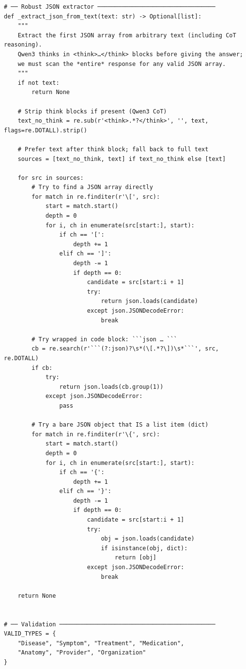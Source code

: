 \documentclass[11pt]{article}
\begin{document}
\begin{lstlisting}[style=pythoncode, caption={kg\_generator\_gpu\_1.py}]
# ── Robust JSON extractor ──────────────────────────────────
def _extract_json_from_text(text: str) -> Optional[list]:
    """
    Extract the first JSON array from arbitrary text (including CoT reasoning).
    Qwen3 thinks in <think>…</think> blocks before giving the answer;
    we must scan the *entire* response for any valid JSON array.
    """
    if not text:
        return None

    # Strip think blocks if present (Qwen3 CoT)
    text_no_think = re.sub(r'<think>.*?</think>', '', text, flags=re.DOTALL).strip()

    # Prefer text after think block; fall back to full text
    sources = [text_no_think, text] if text_no_think else [text]

    for src in sources:
        # Try to find a JSON array directly
        for match in re.finditer(r'\[', src):
            start = match.start()
            depth = 0
            for i, ch in enumerate(src[start:], start):
                if ch == '[':
                    depth += 1
                elif ch == ']':
                    depth -= 1
                    if depth == 0:
                        candidate = src[start:i + 1]
                        try:
                            return json.loads(candidate)
                        except json.JSONDecodeError:
                            break

        # Try wrapped in code block: ```json … ```
        cb = re.search(r'```(?:json)?\s*(\[.*?\])\s*```', src, re.DOTALL)
        if cb:
            try:
                return json.loads(cb.group(1))
            except json.JSONDecodeError:
                pass

        # Try a bare JSON object that IS a list item (dict)
        for match in re.finditer(r'\{', src):
            start = match.start()
            depth = 0
            for i, ch in enumerate(src[start:], start):
                if ch == '{':
                    depth += 1
                elif ch == '}':
                    depth -= 1
                    if depth == 0:
                        candidate = src[start:i + 1]
                        try:
                            obj = json.loads(candidate)
                            if isinstance(obj, dict):
                                return [obj]
                        except json.JSONDecodeError:
                            break

    return None


# ── Validation ─────────────────────────────────────────────
VALID_TYPES = {
    "Disease", "Symptom", "Treatment", "Medication",
    "Anatomy", "Provider", "Organization"
}


\end{lstlisting}
\end{document}

